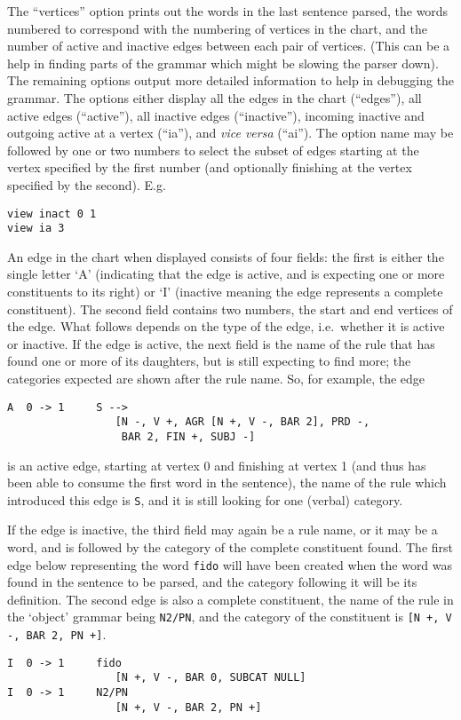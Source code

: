 The ``vertices'' option prints out the words in the last sentence
parsed, the words numbered to correspond with the numbering of vertices
in the chart, and the number of active and inactive edges between each
pair of vertices. (This can be a help in finding parts of the grammar
which might be slowing the parser down). The remaining options output more
detailed information to help in debugging the grammar. The options
either display all the edges in the chart (``edges''), all active edges
(``active''), all inactive edges (``inactive''), incoming inactive and
outgoing active at a vertex (``ia''), and {\it vice versa} (``ai'').
The option name may be followed by one or two numbers to select the
subset of edges starting at the vertex specified by the first number
(and optionally finishing at the vertex specified by the second).
E.g.
\begin{ex}
\begin{verbatim}
view inact 0 1
view ia 3
\end{verbatim}
\end{ex}

An edge in the chart when displayed consists of four fields: the first
is either the single letter `A' (indicating that the edge is active,
and is expecting one or more constituents to its right) or `I'
(inactive meaning the edge represents a complete constituent). The
second field contains two numbers, the start and end vertices of the edge.
What follows depends on the type of the edge, i.e.\ whether it is active
or inactive. If the edge is active, the next field is the name of the
rule that has found one or more of its daughters, but is still expecting
to find more; the categories expected are shown after the rule name.
So, for example, the edge
\begin{ex}
\begin{verbatim}
A  0 -> 1     S --> 
                 [N -, V +, AGR [N +, V -, BAR 2], PRD -,
                  BAR 2, FIN +, SUBJ -]
\end{verbatim}
\end{ex}
is an active edge, starting at vertex 0 and finishing at vertex 1
(and thus has been able to consume the first word in the sentence), the
name of the rule which introduced this edge is {\tt S}, and it is
still looking for one (verbal) category.

If the edge is inactive, the third field may again be a rule name, or it
may be a word, and is followed by the category of the complete
constituent found. The first edge below representing the word {\tt fido}
will have been created when the word was found in the sentence to be
parsed, and the category following it will be its definition. The second
edge is also a complete constituent, the name of the rule in the
`object' grammar being {\tt N2/PN}, and the category of the
constituent is {\tt [N +, V -, BAR 2, PN +]}.
\begin{ex}
\begin{verbatim}
I  0 -> 1     fido
                 [N +, V -, BAR 0, SUBCAT NULL]
I  0 -> 1     N2/PN
                 [N +, V -, BAR 2, PN +]
\end{verbatim}
\end{ex}

